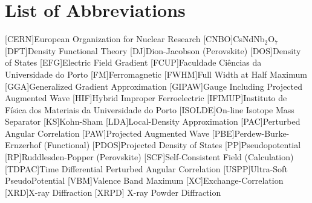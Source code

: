 \chapter*{List of Abbreviations}
\thispagestyle{empty}
\label{chapa2}

\begin{multicols}{2}[]
	\begin{scriptsize}
		\begin{acronym}
			[CERN]{European Organization for Nuclear Research}
			[CNBO]{CsNdNb$_{2}$O$_{7}$}
			[DFT]{Density Functional Theory}
			[DJ]{Dion-Jacobson (Perovskite)}                
			[DOS]{Density of States}
			[EFG]{Electric Field Gradient}
			[FCUP]{Faculdade Ciências da Universidade do Porto}
			[FM]{Ferromagnetic}
			[FWHM]{Full Width at Half Maximum}
			[GGA]{Generalized Gradient Approximation}
			[GIPAW]{Gauge Including Projected Augmented Wave}
			[HIF]{Hybrid Improper Ferroelectric}
			[IFIMUP]{Instituto de Fí\-si\-ca dos Ma\-te\-ri\-ais da U\-ni\-ver\-si\-da\-de do Por\-to}
			[ISOLDE]{On-line Isotope Mass Separator}
			[KS]{Kohn-Sham}
			[LDA]{Local-Density Approximation}
			[PAC]{Perturbed Angular Correlation}
			[PAW]{Projected Augmented Wave}
			[PBE]{Perdew-Burke-Ernzerhof (Functional)}
			[PDOS]{Projected Density of States}
			[PP]{Pseudopotential}
			[RP]{Ruddlesden-Popper (Perovskite)}
			[SCF]{Self-Consistent Field (Calculation)}
			[TDPAC]{Time Differential Perturbed Angular Correlation}
			[USPP]{Ultra-Soft PseudoPotential}
			[VBM]{Valence Band Maximum}
			[XC]{Exchange-Correlation}
			[XRD]{X-ray Diffraction}
			[XRPD]{ X-ray Powder Diffraction}
		\end{acronym}
	\end{scriptsize}
\end{multicols}
\clearemptydoublepage
